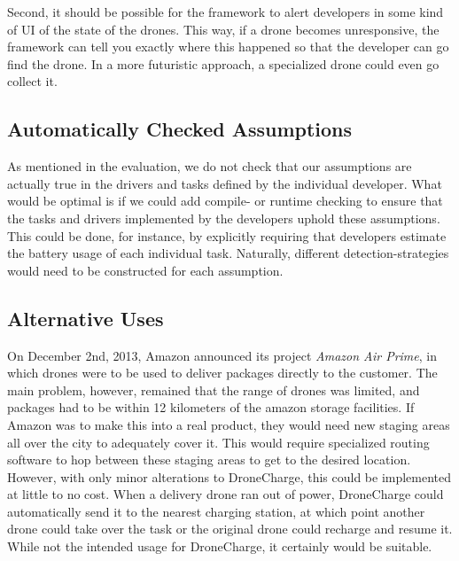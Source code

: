 Second, it should be possible for the framework to alert developers in some kind of UI of the state of the drones. This way, if a drone becomes unresponsive, the framework can tell you exactly where this happened so that the developer can go find the drone. In a more futuristic approach, a specialized drone could even go collect it.

\subsection{Automatically Checked Assumptions}
As mentioned in the evaluation, we do not check that our assumptions are actually true in the drivers and tasks defined by the individual developer. What would be optimal is if we could add compile- or runtime checking to ensure that the tasks and drivers implemented by the developers uphold these assumptions. This could be done, for instance, by explicitly requiring that developers estimate the battery usage of each individual task. Naturally, different detection-strategies would need to be constructed for each assumption.

\subsection{Alternative Uses}
On December 2nd, 2013, Amazon announced its project \textit{Amazon Air Prime}, in which drones were to be used to deliver packages directly to the customer. The main problem, however, remained that the range of drones was limited, and packages had to be within 12 kilometers of the amazon storage facilities. If Amazon was to make this into a real product, they would need new staging areas all over the city to adequately cover it. This would require specialized routing software to hop between these staging areas to get to the desired location. However, with only minor alterations to DroneCharge, this could be implemented at little to no cost. When a delivery drone ran out of power, DroneCharge could automatically send it to the nearest charging station, at which point another drone could take over the task or the original drone could recharge and resume it. While not the intended usage for DroneCharge, it certainly would be suitable.